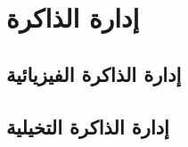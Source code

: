 \documentclass[document.tex]{subfiles}
\begin{document}
\chapter{إدارة الذاكرة}
\section{إدارة الذاكرة الفيزيائية }

\section{إدارة الذاكرة التخيلية }
\end{document}
